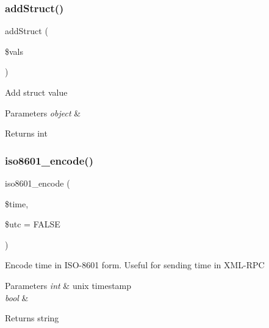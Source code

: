 \subsubsection{\texorpdfstring{add\+Struct()}{addStruct()}}
{\footnotesize\ttfamily add\+Struct (\begin{DoxyParamCaption}\item[{}]{\$vals }\end{DoxyParamCaption})}

Add struct value


\begin{DoxyParams}{Parameters}
{\em object} & \\
\hline
\end{DoxyParams}
\begin{DoxyReturn}{Returns}
int 
\end{DoxyReturn}
\mbox{\label{class_x_m_l___r_p_c___values_a201f99ae311bb2c53526933576c890d0}} 
\subsubsection{\texorpdfstring{iso8601\+\_\+encode()}{iso8601\_encode()}}
{\footnotesize\ttfamily iso8601\+\_\+encode (\begin{DoxyParamCaption}\item[{}]{\$time,  }\item[{}]{\$utc = {\ttfamily FALSE} }\end{DoxyParamCaption})}

Encode time in I\+S\+O-\/8601 form. Useful for sending time in X\+M\+L-\/\+R\+PC


\begin{DoxyParams}{Parameters}
{\em int} & unix timestamp \\
\hline
{\em bool} & \\
\hline
\end{DoxyParams}
\begin{DoxyReturn}{Returns}
string 
\end{DoxyReturn}
\mbox{\label{class_x_m_l___r_p_c___values_a3b169c364729cee2afdccadef5229f80}} 
